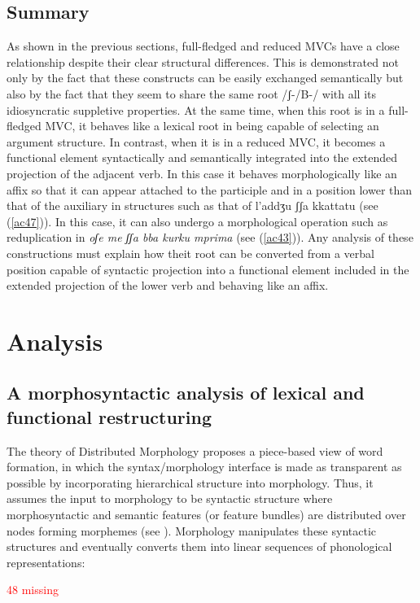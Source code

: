 \documentclass[output=paper]{langscibook}
\begin{document}
\subsection{Summary}

As shown in the previous sections, full-fledged and reduced MVCs have a close relationship despite their clear structural differences. This is demonstrated not only by the fact that these constructs can be easily exchanged semantically but also by the fact that they seem to share the same root /ʃ-/B-/ with all its idiosyncratic suppletive properties. At the same time, when this root is in a full-fledged MVC, it behaves like a lexical root in being capable of selecting an argument structure.  In contrast, when it is in a reduced MVC, it becomes a functional element syntactically and semantically integrated into the extended projection of the adjacent verb. In this case it behaves morphologically like an affix so that it can appear attached to the participle and in a position lower than that of the auxiliary in structures such as that of l'addʒu ʃʃa kkattatu (see (\ref{ac47})).  In this case, it can also undergo a morphological operation such as reduplication in \textit{oʃe me ʃʃa bba kurku mprima} (see (\ref{ac43})). Any analysis of these constructions must explain how theit root can be converted from a verbal position capable of syntactic projection into a functional element included in the extended projection of the lower verb and behaving like an affix.

\section{Analysis}
\subsection{A morphosyntactic analysis of lexical and functional restructuring}

The theory of Distributed Morphology proposes a piece-based view of word formation, in which the syntax/morphology interface is made as transparent as possible by incorporating hierarchical structure into morphology. Thus, it assumes the input to morphology to be syntactic structure where morphosyntactic and semantic features (or feature bundles) are distributed over nodes forming morphemes (see \cite{halle1993a}). Morphology manipulates these syntactic structures and eventually converts them into linear sequences of phonological representations:
 
\ea \label{ac48}\textcolor{red}{48 missing}
\z
\end{document}
